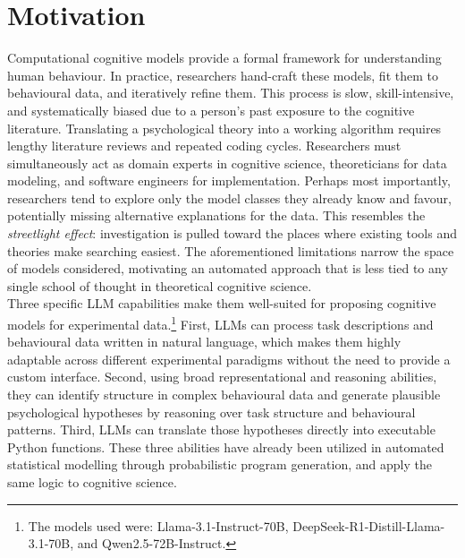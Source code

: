 \section{Motivation}

Computational cognitive models provide a formal framework for understanding human behaviour. In practice, researchers hand-craft these models, fit them to behavioural data, and iteratively refine them. This process is slow, skill-intensive, and systematically biased due to a person's past exposure to the cognitive literature. Translating a psychological theory into a working algorithm requires lengthy literature reviews and repeated coding cycles. Researchers must simultaneously act as domain experts in cognitive science, theoreticians for data modeling, and software engineers for implementation. Perhaps most importantly, researchers tend to explore only the model classes they already know and favour, potentially missing alternative explanations for the data. This resembles the \emph{streetlight effect}: investigation is pulled toward the places where existing tools and theories make searching easiest. The aforementioned limitations narrow the space of models considered, motivating an automated approach that is less tied to any single school of thought in theoretical cognitive science.\\

Three specific LLM capabilities make them well-suited for proposing cognitive models for experimental data.\footnote{The models used were: Llama-3.1-Instruct-70B, DeepSeek-R1-Distill-Llama-3.1-70B, and Qwen2.5-72B-Instruct.} First, LLMs can process task descriptions and behavioural data written in natural language, which makes them highly adaptable across different experimental paradigms without the need to provide a custom interface. Second, using broad representational and reasoning abilities, they can identify structure in complex behavioural data and generate plausible psychological hypotheses by reasoning over task structure and behavioural patterns. Third, LLMs can translate those hypotheses directly into executable Python functions. These three abilities have already been utilized in automated statistical modelling through probabilistic program generation, and \citet{rmus2025generating} apply the same logic to cognitive science.


